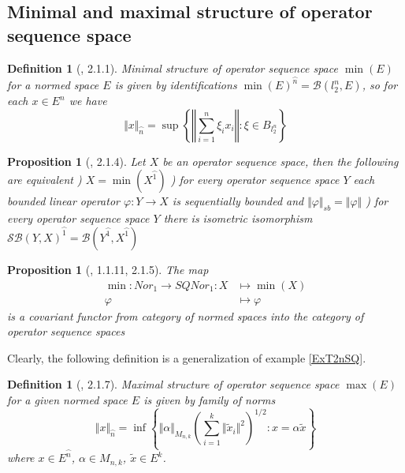 \documentclass[12pt]{article}
\newtheorem{proposition}[theorem]{Proposition}
\newtheorem{definition}[theorem]{Definition}
\begin{document}
\subsection{Minimal and maximal structure of operator sequence space}

\begin{definition}[\cite{LamOpFolgen}, 2.1.1]\label{DefSQMin} Minimal structure of operator sequence space $\min(E)$ for a normed space $E$ is given by identifications $\min(E)^{\wideparen{n}} = \mathcal{B}(l_2^n, E)$, so for each $x \in E^n$ we have
$$
\Vert x\Vert_{\wideparen{n}}=\sup\left\{\left\Vert\sum\limits_{i=1}^n \xi_i x_i\right\Vert:\xi\in B_{l_2^n}\right\}
$$
\end{definition}

\begin{proposition}[\cite{LamOpFolgen}, 2.1.4]\label{PrCharMinSQ}
Let $X$ be an operator sequence space, then the following are equivalent
) $X=\min(X^{\wideparen{1}})$
) for every operator sequence space $Y$ each bounded linear operator $\varphi:Y\to X$ is sequentially bounded and $\Vert\varphi\Vert_{sb}=\Vert\varphi\Vert$
) for every operator sequence space $Y$ there is isometric isomorphism $\mathcal{SB}(Y,X)^{\wideparen{1}}=\mathcal{B}(Y^{\wideparen{1}},X^{\wideparen{1}})$
\end{proposition}

\begin{proposition}[\cite{LamOpFolgen}, 1.1.11, 2.1.5]\label{PrMinFucntor}
The map
$$
\begin{aligned}
\min : Nor_1 \to SQNor_1 : X&\mapsto \min(X)\\
\varphi&\mapsto\varphi
\end{aligned}
$$
is a covariant functor from category of normed spaces into the category of operator sequence spaces
\end{proposition}

Clearly, the following definition is a generalization of example \ref{ExT2nSQ}.

\begin{definition}[\cite{LamOpFolgen}, 2.1.7]\label{DefSQMax} Maximal structure of operator sequence space $\max(E)$ for a given normed space $E$ is given by family of norms
$$
\Vert x\Vert_{\wideparen{n}}=\inf\left\{\Vert\alpha\Vert_{M_{n,k}}\left(\sum\limits_{i=1}^k\Vert \tilde   x_i\Vert^2\right)^{1/2}:x=\alpha\tilde x\right\}
$$
where $x\in E^{\wideparen{n}}$, $\alpha\in M_{n,k}$, $\tilde{x}\in E^k$.
\end{definition}
\end{document}
